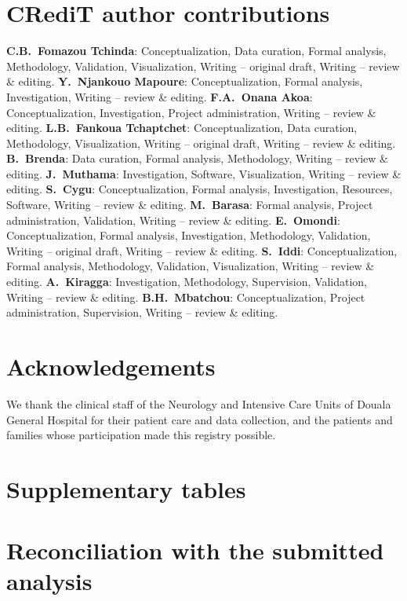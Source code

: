 \documentclass[preprint,10pt]{elsarticle}
\begin{document}
\section*{CRediT author contributions}
\textbf{C.B.\ Fomazou Tchinda}: Conceptualization, Data curation, Formal analysis, Methodology, Validation, Visualization, Writing -- original draft, Writing -- review \& editing. \textbf{Y.\ Njankouo Mapoure}: Conceptualization, Formal analysis, Investigation, Writing -- review \& editing. \textbf{F.A.\ Onana Akoa}: Conceptualization, Investigation, Project administration, Writing -- review \& editing. \textbf{L.B.\ Fankoua Tchaptchet}: Conceptualization, Data curation, Methodology, Visualization, Writing -- original draft, Writing -- review \& editing. \textbf{B.\ Brenda}: Data curation, Formal analysis, Methodology, Writing -- review \& editing. \textbf{J.\ Muthama}: Investigation, Software, Visualization, Writing -- review \& editing. \textbf{S.\ Cygu}: Conceptualization, Formal analysis, Investigation, Resources, Software, Writing -- review \& editing. \textbf{M.\ Barasa}: Formal analysis, Project administration, Validation, Writing -- review \& editing. \textbf{E.\ Omondi}: Conceptualization, Formal analysis, Investigation, Methodology, Validation, Writing -- original draft, Writing -- review \& editing. \textbf{S.\ Iddi}: Conceptualization, Formal analysis, Methodology, Validation, Visualization, Writing -- review \& editing. \textbf{A.\ Kiragga}: Investigation, Methodology, Supervision, Validation, Writing -- review \& editing. \textbf{B.H.\ Mbatchou}: Conceptualization, Project administration, Supervision, Writing -- review \& editing.

\section*{Acknowledgements}
We thank the clinical staff of the Neurology and Intensive Care Units of Douala General Hospital for their patient care and data collection, and the patients and families whose participation made this registry possible.




\clearpage
\appendix
\setcounter{table}{0}
\section{Supplementary tables}
\label{app:supp}











\clearpage
\setcounter{table}{0}
\section{Reconciliation with the submitted analysis}
\label{app:recon}

\end{document}
